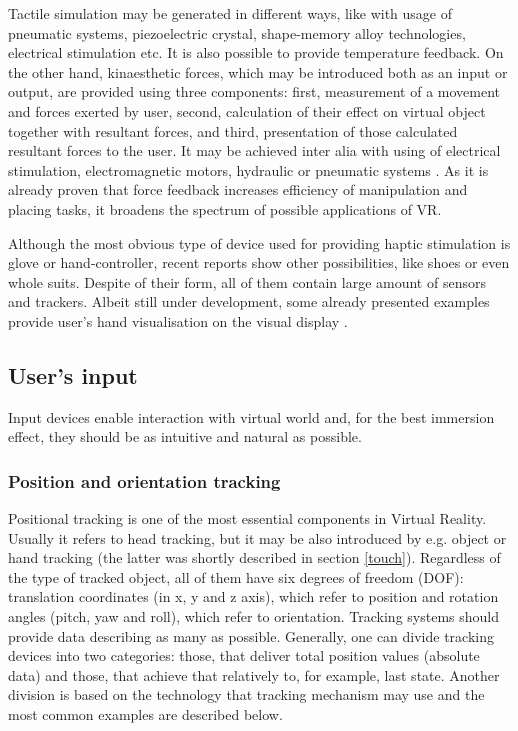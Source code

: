 Tactile simulation may be generated in different ways, like with usage of pneumatic systems, piezoelectric crystal, shape-memory alloy technologies, electrical stimulation etc. It is also possible to provide temperature feedback. On the other hand, kinaesthetic forces, which may be introduced both as an input or output, are provided using three components: first, measurement of a movement and forces exerted by user, second, calculation of their effect on virtual object together with resultant forces, and third, presentation of those calculated resultant forces to the user. It may be achieved inter alia with using of electrical stimulation, electromagnetic motors, hydraulic or pneumatic systems \cite{Mazuryk96, Gobbetti99}. As it is already proven that force feedback increases efficiency of manipulation and placing tasks, it broadens the spectrum of possible applications of VR.

Although the most obvious type of device used for providing haptic stimulation is glove or hand-controller, recent reports show other possibilities, like shoes or even whole suits. Despite of their form, all of them contain large amount of sensors and trackers. Albeit still under development, some already presented examples provide user's hand visualisation on the visual display \cite{Marco15}.
\subsection{User's input}%
Input devices enable interaction with virtual world and, for the best immersion effect, they should be as intuitive and natural as possible. 
\subsubsection{Position and orientation tracking}
Positional tracking is one of the most essential components in Virtual Reality. Usually it refers to head tracking, but it may be also introduced by e.g. object or hand tracking (the latter was shortly described in section \ref{touch}). Regardless of the type of tracked object, all of them have six degrees of freedom (DOF): translation coordinates (in x, y and z axis), which refer to position and rotation angles (pitch, yaw and roll), which refer to orientation. Tracking systems should provide data describing as many as possible. Generally, one can divide tracking devices into two categories: those, that deliver total position values (absolute data) and those, that achieve that relatively to, for example, last state. Another division is based on the technology that tracking mechanism may use and the most common examples are described below.

